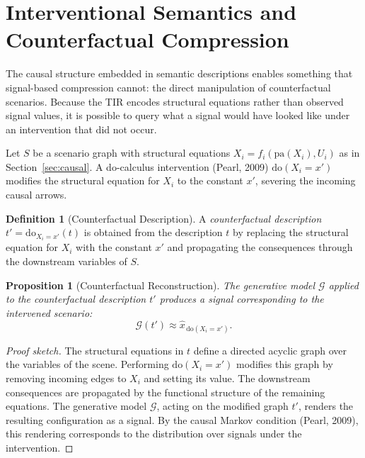 \documentclass[11pt,a4paper]{article}
\newtheorem{proposition}[theorem]{Proposition}
\theoremstyle{definition}
\newtheorem{definition}[theorem]{Definition}
\theoremstyle{remark}
\begin{document}
\section{Interventional Semantics and Counterfactual Compression}
\label{sec:counterfactual}

The causal structure embedded in semantic descriptions enables something that signal-based compression cannot: the direct manipulation of counterfactual scenarios. Because the TIR encodes structural equations rather than observed signal values, it is possible to query what a signal would have looked like under an intervention that did not occur.

Let $S$ be a scenario graph with structural equations $X_i = f_i(\mathrm{pa}(X_i), U_i)$ as in Section~\ref{sec:causal}. A do-calculus intervention (Pearl, 2009) $\mathrm{do}(X_i = x')$ modifies the structural equation for $X_i$ to the constant $x'$, severing the incoming causal arrows.

\begin{definition}[Counterfactual Description]
A \emph{counterfactual description} $t' = \mathrm{do}_{X_i = x'}(t)$ is obtained from the description $t$ by replacing the structural equation for $X_i$ with the constant $x'$ and propagating the consequences through the downstream variables of $S$.
\end{definition}

\begin{proposition}[Counterfactual Reconstruction]
The generative model $\mathcal{G}$ applied to the counterfactual description $t'$ produces a signal corresponding to the intervened scenario:
\[
\mathcal{G}(t') \approx \widehat{x}_{\,\mathrm{do}(X_i = x')}.
\]
\end{proposition}

\begin{proof}[Proof sketch]
The structural equations in $t$ define a directed acyclic graph over the variables of the scene. Performing $\mathrm{do}(X_i = x')$ modifies this graph by removing incoming edges to $X_i$ and setting its value. The downstream consequences are propagated by the functional structure of the remaining equations. The generative model $\mathcal{G}$, acting on the modified graph $t'$, renders the resulting configuration as a signal. By the causal Markov condition (Pearl, 2009), this rendering corresponds to the distribution over signals under the intervention.
\end{proof}
\end{document}
